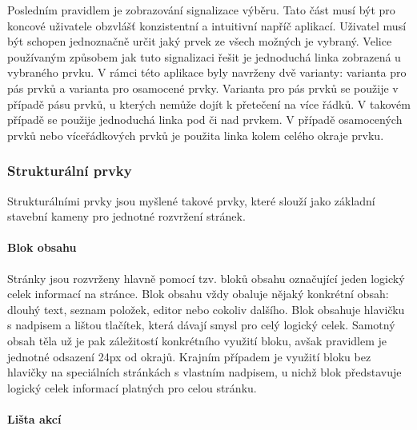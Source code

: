 		Posledním pravidlem je zobrazování signalizace výběru.
		Tato část musí být pro koncové uživatele obzvlášť konzistentní a intuitivní napříč aplikací.
		Uživatel musí být schopen jednoznačně určit jaký prvek ze všech možných je vybraný.
		Velice používaným způsobem jak tuto signalizaci řešit je jednoduchá linka zobrazená u vybraného prvku.
		V rámci této aplikace byly navrženy dvě varianty: varianta pro pás prvků a varianta pro osamocené prvky.
		Varianta pro pás prvků se použije v případě pásu prvků, u kterých nemůže dojít k přetečení na více řádků.
		V takovém případě se použije jednoduchá linka pod či nad prvkem.
		V případě osamocených prvků nebo víceřádkových prvků je použita linka kolem celého okraje prvku.



		\newpage

		\subsubsection{Strukturální prvky}

		Strukturálními prvky jsou myšlené takové prvky, které slouží jako základní stavební kameny pro jednotné
		rozvržení stránek.

			\paragraph{Blok obsahu}

			Stránky jsou rozvrženy hlavně pomocí tzv. bloků obsahu označující jeden logický celek informací
			na stránce.
			Blok obsahu vždy obaluje nějaký konkrétní obsah: dlouhý text, seznam položek, editor nebo cokoliv dalšího.
			Blok obsahuje hlavičku s nadpisem a lištou tlačítek, která dávají smysl pro celý logický celek.
			Samotný obsah těla už je pak záležitostí konkrétního využití bloku, avšak pravidlem je jednotné odsazení 24px od
			okrajů.
			Krajním případem je využití bloku bez hlavičky na speciálních stránkách s vlastním nadpisem, u nichž blok
			představuje logický celek informací platných pro celou stránku.


			\paragraph{Lišta akcí}

